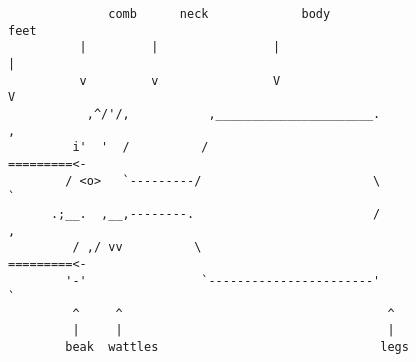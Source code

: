 \begin{figure}[ht!]
    \centering\small
    \begin{verbatim}
              comb      neck             body                    feet
          |         |                |                       |
          v         v                V                       V
           ,^/'/,           ,______________________.         ,
         i'  '  /          /                       =========<-
        / <o>   `---------/                        \         `
      .;__.  ,__,--------.                         /         ,
         / ,/ vv          \                        =========<-
        '-'                `-----------------------'         `
         ^     ^                                     ^
         |     |                                     |
        beak  wattles                               legs

    \end{verbatim}
    \caption{}
    \label{fig:chicken}
\end{figure}